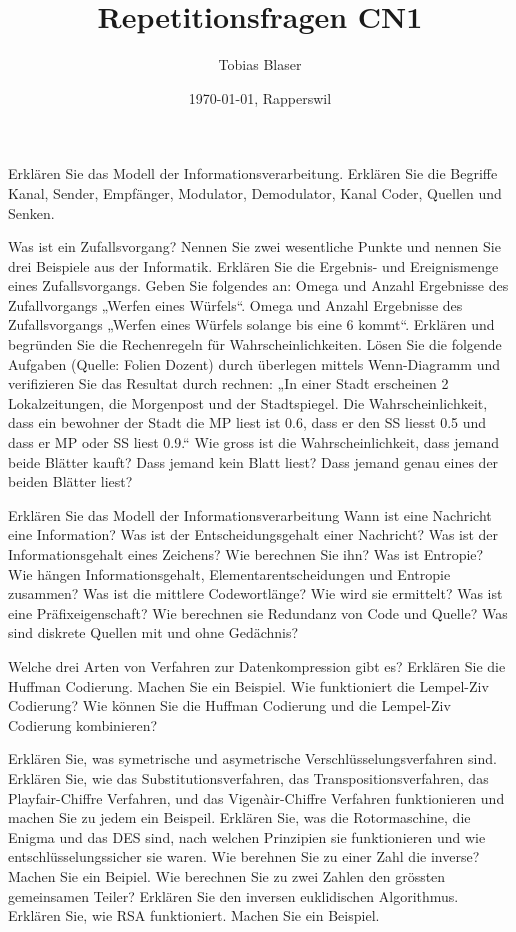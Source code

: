 \documentclass[ngerman,a4paper,12pt]{scrreprt}
\title{Repetitionsfragen CN1}
\author{Tobias Blaser}
\date{\today{}, Rapperswil}
\begin{document}
\tableofcontents
\clearpage



\ol
	\li Erklären Sie das Modell der Informationsverarbeitung. Erklären Sie die Begriffe Kanal, Sender, Empfänger, Modulator, Demodulator, Kanal Coder, Quellen und Senken.
\olS

\olR
	\li Was ist ein Zufallsvorgang? Nennen Sie zwei wesentliche Punkte und nennen Sie drei Beispiele aus der Informatik.
	\li Erklären Sie die Ergebnis- und Ereignismenge eines Zufallsvorgangs. Geben Sie folgendes an:
		\ol
			\li Omega und Anzahl Ergebnisse des Zufallvorgangs „Werfen eines Würfels“.
			\li Omega und Anzahl Ergebnisse des Zufallsvorgangs „Werfen eines Würfels solange bis eine 6 kommt“.
		\olE
	\li Erklären und begründen Sie die Rechenregeln für Wahrscheinlichkeiten.
	\li Lösen Sie die folgende Aufgaben (Quelle: Folien Dozent) durch überlegen mittels Wenn-Diagramm und verifizieren Sie das Resultat durch rechnen: 
„In einer Stadt erscheinen 2 Lokalzeitungen, die Morgenpost und der Stadtspiegel. Die Wahrscheinlichkeit, dass ein bewohner der Stadt die MP liest ist 0.6, dass er den SS liesst 0.5 und dass er MP oder SS liest 0.9.“	
Wie gross ist die Wahrscheinlichkeit, 
		\ol
			\li dass jemand beide Blätter kauft?
			\li Dass jemand kein Blatt liest?
			\li Dass jemand genau eines der beiden Blätter liest?
		\olE
\olS


\olR
	\li Erklären Sie das Modell der Informationsverarbeitung
	\li Wann ist eine Nachricht eine Information?
	\li Was ist der Entscheidungsgehalt einer Nachricht? Was ist der Informationsgehalt eines Zeichens? Wie berechnen Sie ihn?
	\li Was ist Entropie? Wie hängen Informationsgehalt, Elementarentscheidungen und Entropie zusammen?
	\li Was ist die mittlere Codewortlänge? Wie wird sie ermittelt?
	\li Was ist eine Präfixeigenschaft?
	\li Wie berechnen sie Redundanz von Code und Quelle?
	\li Was sind diskrete Quellen mit und ohne Gedächnis?
\olS


\olR
	\li Welche drei Arten von Verfahren zur Datenkompression gibt es?
	\li Erklären Sie die Huffman Codierung. Machen Sie ein Beispiel.
	\li Wie funktioniert die Lempel-Ziv Codierung?
	\li Wie können Sie die Huffman Codierung und die Lempel-Ziv Codierung kombinieren?
\olS


\olR
	\li Erklären Sie, was symetrische und asymetrische Verschlüsselungsverfahren sind.
	\li Erklären Sie, wie das Substitutionsverfahren, das Transpositionsverfahren, das Playfair-Chiffre Verfahren, und das Vigenàir-Chiffre Verfahren funktionieren und machen Sie zu jedem ein Beispeil.
	\li Erklären Sie, was die Rotormaschine, die Enigma und das DES sind, nach welchen Prinzipien sie funktionieren und wie entschlüsselungssicher sie waren.
	\li Wie berehnen Sie zu einer Zahl die inverse? Machen Sie ein Beipiel.
	\li Wie berechnen Sie zu zwei Zahlen den grössten gemeinsamen Teiler?
	\li Erklären Sie den inversen euklidischen Algorithmus.
	\li Erklären Sie, wie RSA funktioniert. Machen Sie ein Beispiel.
\olS
\end{document}
